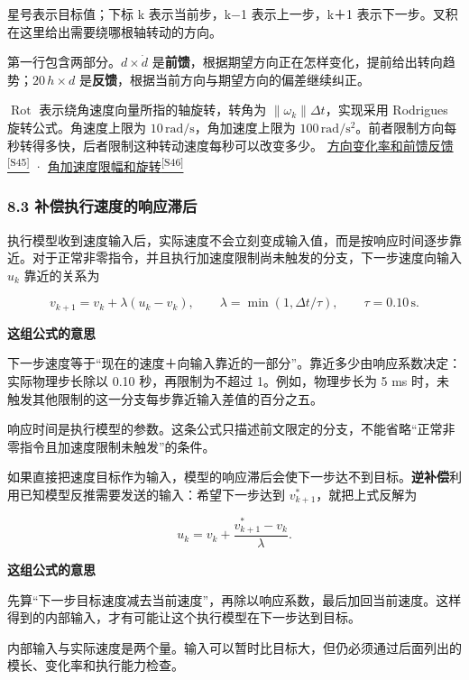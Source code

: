 \documentclass[12pt,a4paper]{article}
\numberwithin{equation}{topic}
\newcommand{\sourceref}[2]{\hyperlink{source-#1}{#2\textsuperscript{[#1]}}}
\begin{document}
星号表示目标值；下标 k 表示当前步，k−1 表示上一步，k＋1 表示下一步。叉积在这里给出需要绕哪根轴转动的方向。


第一行包含两部分。\(d\times\dot d\) 是\textbf{前馈}，根据期望方向正在怎样变化，提前给出转向趋势；\(20\,h\times d\) 是\textbf{反馈}，根据当前方向与期望方向的偏差继续纠正。

\(\operatorname{Rot}\) 表示绕角速度向量所指的轴旋转，转角为 \(\|\omega_k\|\Delta t\)，实现采用 Rodrigues 旋转公式。角速度上限为 \(10\,\mathrm{rad/s}\)，角加速度上限为 \(100\,\mathrm{rad/s^2}\)。前者限制方向每秒转得多快，后者限制这种转动速度每秒可以改变多少。 \sourceref{S45}{方向变化率和前馈反馈} · \sourceref{S46}{角加速度限幅和旋转}

\subsubsection*{8.3 补偿执行速度的响应滞后}

执行模型收到速度输入后，实际速度不会立刻变成输入值，而是按响应时间逐步靠近。对于正常非零指令，并且执行加速度限制尚未触发的分支，下一步速度向输入 \(u_k\) 靠近的关系为

\begin{equation}
\label{eq:actuator}
v_{k+1}=v_k+\lambda(u_k-v_k),\qquad
\lambda=\min(1,\Delta t/\tau),\qquad \tau=0.10\,\mathrm s.
\end{equation}

\noindent\textbf{这组公式的意思}\par\nobreak
下一步速度等于“现在的速度＋向输入靠近的一部分”。靠近多少由响应系数决定：实际物理步长除以 0.10 秒，再限制为不超过 1。例如，物理步长为 5 ms 时，未触发其他限制的这一分支每步靠近输入差值的百分之五。

响应时间是执行模型的参数。这条公式只描述前文限定的分支，不能省略“正常非零指令且加速度限制未触发”的条件。


如果直接把速度目标作为输入，模型的响应滞后会使下一步达不到目标。\textbf{逆补偿}利用已知模型反推需要发送的输入：希望下一步达到 \(v^*_{k+1}\)，就把上式反解为

\begin{equation}
\label{eq:compensation}
u_k=v_k+\frac{v^*_{k+1}-v_k}{\lambda}.
\end{equation}

\noindent\textbf{这组公式的意思}\par\nobreak
先算“下一步目标速度减去当前速度”，再除以响应系数，最后加回当前速度。这样得到的内部输入，才有可能让这个执行模型在下一步达到目标。

内部输入与实际速度是两个量。输入可以暂时比目标大，但仍必须通过后面列出的模长、变化率和执行能力检查。
\end{document}
